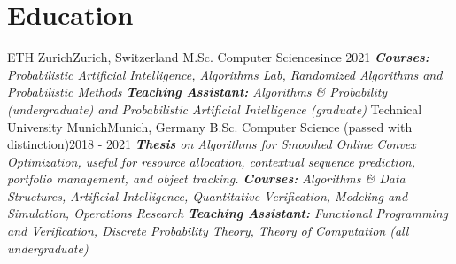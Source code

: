 \documentclass[a4paper,20pt]{article}
\begin{document}
\section{Education}
  \resumeSubHeadingListStart
    \resumeSubheading
      {ETH Zurich}{Zurich, Switzerland}
      {M.Sc. Computer Science}{since 2021}
      {\scriptsize \textit{ \footnotesize{\newline{}\textbf{Courses:} Probabilistic Artificial Intelligence, Algorithms Lab, Randomized Algorithms and Probabilistic Methods}
      \footnotesize{\newline{}\textbf{Teaching Assistant:} Algorithms \& Probability (undergraduate) and Probabilistic Artificial Intelligence (graduate)}}}
    \resumeSubHeadingListEnd
\vspace{-5pt}
  \resumeSubHeadingListStart
    \resumeSubheading
      {Technical University Munich}{Munich, Germany}
      {B.Sc. Computer Science (passed with distinction)}{2018 - 2021}
      {\scriptsize \textit{
      \footnotesize{\newline{}\textbf{Thesis} on Algorithms for Smoothed Online Convex Optimization, useful for resource allocation, contextual sequence prediction, portfolio management, and object tracking.} \footnotesize{\newline{}\textbf{Courses:} Algorithms \& Data Structures, Artificial Intelligence, Quantitative Verification, Modeling and Simulation, Operations Research}
      \footnotesize{\newline{}\textbf{Teaching Assistant:} Functional Programming and Verification, Discrete Probability Theory, Theory of Computation (all undergraduate)}}}
    \resumeSubHeadingListEnd

\vspace{-5pt}
\end{document}
